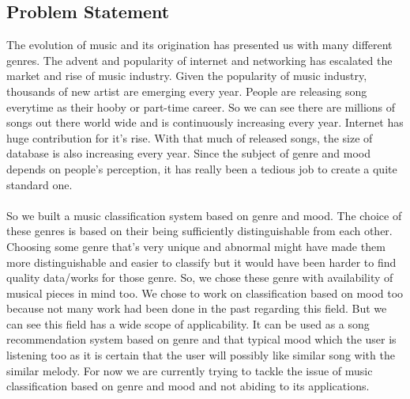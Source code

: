 \subsection{Problem Statement}
The evolution of music and its origination has presented us with many different genres. The advent and popularity of internet and networking
has escalated the market and rise of music industry. Given the popularity of music industry, thousands of new artist are emerging every year. 
People are releasing song everytime as their hooby or part-time career. So we can see there are millions of songs out there world wide and is
continuously increasing every year. Internet has huge contribution for it's rise. With that much of released songs, the size of database is also 
increasing every year. Since the subject of genre and mood depends on people's perception, it has really been a tedious job to create a quite standard 
one.\\ 
\\
So we built a music classification system based on genre and mood. The choice of these genres is based on their being sufficiently distinguishable from each other.
Choosing some genre that’s very unique and abnormal might have made them more distinguishable and easier to classify but it would have been harder
to find quality data/works for those genre. So, we chose these genre with availability of musical pieces in mind too. We chose to work on 
classification based on mood too because not many work had been done in the past regarding this field. But we can see this field has a wide 
scope of applicability. It can be used as a song recommendation system based on genre and that typical mood which the user is listening
too as it is certain that the user will possibly like similar song with the similar melody. For now we are currently trying to tackle the issue of
music classification based on genre and mood and not abiding to its applications. 


